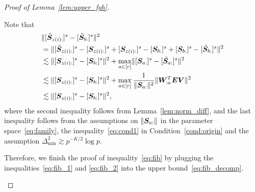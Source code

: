 \documentclass[journal]{IEEEtran}
\theoremstyle{definition}
\theoremstyle{definition}
\begin{document}
\begin{proof}[Proof of Lemma~\ref{lem:upper_fgh}]
\begin{enumerate}[wide]
    Note that 
    \small
    \begin{align}
        &\onormSize{}{  [  \tilde \mS_{z(i):} ]^s - [  \tilde \mS_{b:} ]^s  }^2 \\
        &=  \onormSize{}{  [  \tilde \mS_{z(i):} ]^s -[ \mS_{z(i):} ]^s +  [ \mS_{z(i):} ]^s - [ \mS_{b:} ]^s + [ \mS_{b:} ]^s -[  \tilde \mS_{b:} ]^s  }^2 \\
        & \lesssim \onormSize{}{ [ \mS_{z(i):} ]^s - [ \mS_{b:} ]^s }^2 + \max_{a \in [r]} \onormSize{}{ [ \mS_{a:} ]^s -[  \tilde \mS_{a:} ]^s }^2 \\
        & \lesssim \onormSize{}{ [ \mS_{z(i):} ]^s - [ \mS_{b:} ]^s }^2  + \max_{a \in [r]} \frac{1}{\onormSize{}{\mS_{a:} }^2} \onormSize{}{ \mW_{:a}^T \mE \mV}^2\\
        & \lesssim \onormSize{}{ [ \mS_{z(i):} ]^s - [ \mS_{b:} ]^s }^2, \label{eq:fib_2}
    \end{align}
    \normalsize
    where the second inequality follows from Lemma~\ref{lem:norm_diff}, and the last inequality follows from the assumptions on $\lVert\bm S_{a:}\rVert$ in the parameter space~\eqref{eq:family}, the inequality~\eqref{eq:cond1} in Condition~\ref{cond:origin} and the assumption $\Delta_{\min}^2 \gtrsim p^{-K/2}\log p$. 
    
    Therefore, we finish the proof of inequality~\eqref{eq:fib} by plugging the inequalities~\eqref{eq:fib_1} and \eqref{eq:fib_2} into the upper bound~\eqref{eq:fib_decomp}.
    

\end{enumerate}
\end{proof}
\end{document}
